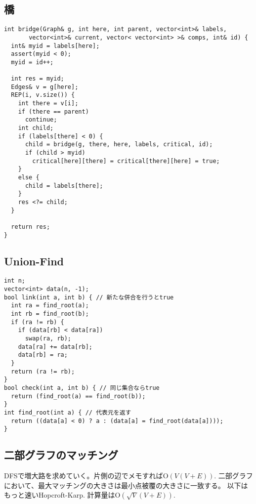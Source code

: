 \subsection{橋}

\begin{lstlisting}
int bridge(Graph& g, int here, int parent, vector<int>& labels,
       vector<int>& current, vector< vector<int> >& comps, int& id) {
  int& myid = labels[here];
  assert(myid < 0);
  myid = id++;

  int res = myid;
  Edges& v = g[here];
  REP(i, v.size()) {
    int there = v[i];
    if (there == parent)
      continue;
    int child;
    if (labels[there] < 0) {
      child = bridge(g, there, here, labels, critical, id);
      if (child > myid)
        critical[here][there] = critical[there][here] = true;
    }
    else {
      child = labels[there];
    }
    res <?= child;
  }

  return res;
}
\end{lstlisting}



\subsection{Union-Find}

\begin{lstlisting}
int n;
vector<int> data(n, -1);
bool link(int a, int b) { // 新たな併合を行うとtrue
  int ra = find_root(a);
  int rb = find_root(b);
  if (ra != rb) {
    if (data[rb] < data[ra])
      swap(ra, rb);
    data[ra] += data[rb];
    data[rb] = ra;
  }
  return (ra != rb);
}
bool check(int a, int b) { // 同じ集合ならtrue
  return (find_root(a) == find_root(b));
}
int find_root(int a) { // 代表元を返す
  return ((data[a] < 0) ? a : (data[a] = find_root(data[a])));
}
\end{lstlisting}



\subsection{二部グラフのマッチング}

DFSで増大路を求めていく。片側の辺でメモすれば$\mathrm{O}(V(V+E))$.
二部グラフにおいて、最大マッチングの大きさは最小点被覆の大きさに一致する。
以下はもっと速いHopcroft-Karp. 計算量は$\mathrm{O}(\sqrt{V}(V+E))$.


